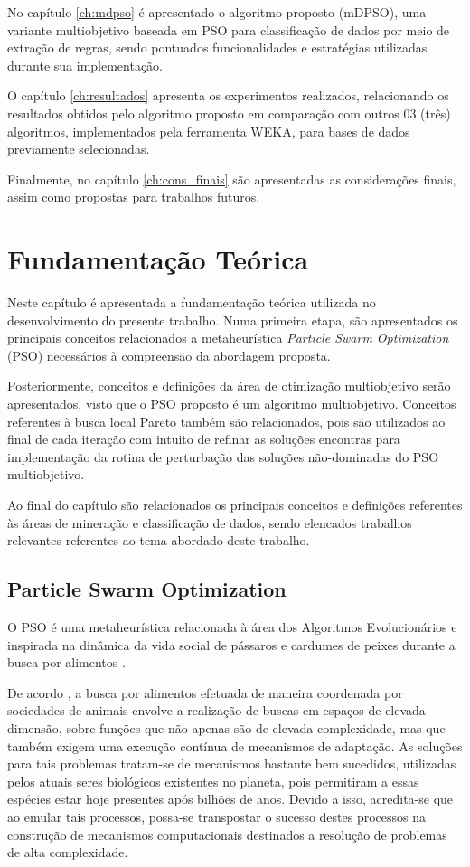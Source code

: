 \documentclass[
	12pt,				%
	openany,			%
	oneside,	
	a4paper,			%
	brazil,				%
	]{unimontes-ppgmsc-abntex2}
\begin{document}
No capítulo \ref{ch:mdpso} é apresentado o algoritmo proposto (mDPSO), uma variante multiobjetivo baseada em PSO para classificação de dados por meio de extração de regras, sendo pontuados funcionalidades e estratégias utilizadas durante sua implementação.

O capítulo \ref{ch:resultados} apresenta os experimentos realizados, relacionando os resultados obtidos pelo algoritmo proposto em comparação com outros 03 (três) algoritmos, implementados pela ferramenta WEKA, para bases de dados previamente selecionadas.

Finalmente, no capítulo \ref{ch:cons_finais} são apresentadas as considerações finais, assim como propostas para trabalhos futuros.


\chapter{Fundamentação Teórica}
\label{ch:ref_teorico}

Neste capítulo é apresentada a fundamentação teórica utilizada no desenvolvimento do presente trabalho. Numa primeira etapa, são apresentados os principais conceitos relacionados a metaheurística {\em Particle Swarm Optimization} (PSO) necessários à compreensão da abordagem proposta. 

Posteriormente, conceitos e definições da área de otimização multiobjetivo serão apresentados, visto que o PSO proposto é um algoritmo multiobjetivo. Conceitos referentes à busca local Pareto também são relacionados, pois são utilizados ao final de cada iteração com intuito de refinar as soluções encontras para implementação da rotina de perturbação das soluções não-dominadas do PSO multiobjetivo. 

Ao final do capítulo são relacionados os principais conceitos e definições referentes às áreas de mineração e classificação de dados, sendo elencados trabalhos relevantes referentes ao tema abordado deste trabalho.


\section{Particle Swarm Optimization}
\label{ch:pso}

O PSO é uma metaheurística relacionada à área dos Algoritmos Evolucionários e inspirada na dinâmica da vida social de pássaros e cardumes de peixes durante a busca por alimentos \cite{Kennedy_1995}.

De acordo , a busca por alimentos efetuada de maneira coordenada por sociedades de animais envolve a realização de buscas em espaços de elevada dimensão, sobre funções que não apenas são de elevada complexidade, mas que também exigem uma execução contínua de mecanismos de adaptação. As soluções para tais problemas tratam-se de mecanismos bastante bem sucedidos, utilizadas pelos atuais seres biológicos existentes no planeta, pois permitiram a essas espécies estar hoje presentes após bilhões de anos. Devido a isso, acredita-se que ao emular tais processos, possa-se transpostar o sucesso destes processos na construção de mecanismos computacionais destinados a resolução de problemas de alta complexidade.
 
\end{document}
